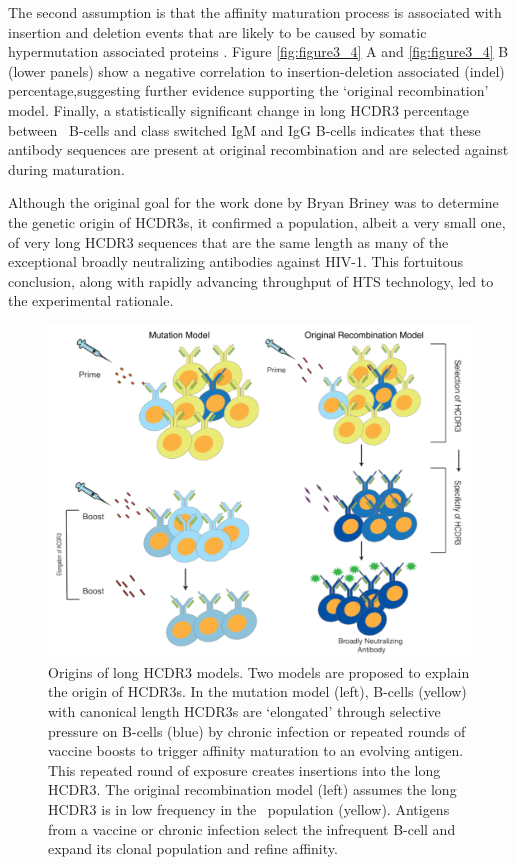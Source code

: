 The second assumption is that the affinity maturation process is associated with insertion and deletion events that are likely to be caused by somatic hypermutation associated proteins \citep{Reason:2006cp,Wilson:1998wo,Wilson:1998ut}. Figure \ref{fig:figure3_4} A and \ref{fig:figure3_4} B (lower panels) show a negative correlation to insertion-deletion associated (indel) percentage,suggesting further evidence supporting the `original recombination' model. Finally, a statistically significant change in long HCDR3 percentage between \naive~B-cells and class switched IgM and IgG B-cells indicates that these antibody sequences are present at original recombination and are selected against during maturation.

Although the original goal for the work done by Bryan Briney was to determine the genetic origin of HCDR3s, it confirmed a population, albeit a very small one, of very long HCDR3 sequences that are the same length as many of the exceptional broadly neutralizing antibodies against HIV-1. This fortuitous conclusion, along with rapidly advancing throughput of HTS technology, led to the experimental rationale.

\begin{figure}[!tH]
   \centering
   \includegraphics[width=.99\textwidth]{images/chapter3/figure3_2.pdf} %
   \caption[Origins of Long HCDR3 Models]{Origins of long HCDR3 models. Two models are proposed to explain the origin of HCDR3s. In the mutation model (left), B-cells (yellow) with canonical length HCDR3s are `elongated' through selective pressure on B-cells (blue) by chronic infection or repeated rounds of vaccine boosts to trigger affinity maturation to an evolving antigen. This repeated round of exposure creates insertions into the long HCDR3. The original recombination model (left) assumes the long HCDR3 is in low frequency in the \naive~population (yellow). Antigens from a vaccine or chronic infection select the infrequent B-cell and expand its clonal population and refine affinity.}
   \label{fig:figure3_2}
\end{figure}


